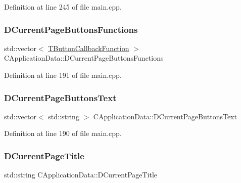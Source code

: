 Definition at line 245 of file main.\+cpp.

\hypertarget{classCApplicationData_ad3079e5563a19d21c1e4ceff2a188382}{}\label{classCApplicationData_ad3079e5563a19d21c1e4ceff2a188382} 
\subsubsection{\texorpdfstring{D\+Current\+Page\+Buttons\+Functions}{DCurrentPageButtonsFunctions}}
{\footnotesize\ttfamily std\+::vector$<$ \hyperlink{main_8cpp_af91bc223ea3fea871af009bfef33c595}{T\+Button\+Callback\+Function} $>$ C\+Application\+Data\+::\+D\+Current\+Page\+Buttons\+Functions\hspace{0.3cm}{\ttfamily [protected]}}



Definition at line 191 of file main.\+cpp.

\hypertarget{classCApplicationData_af04b7f5f8ba4e5c99c0a3530055fc15d}{}\label{classCApplicationData_af04b7f5f8ba4e5c99c0a3530055fc15d} 
\subsubsection{\texorpdfstring{D\+Current\+Page\+Buttons\+Text}{DCurrentPageButtonsText}}
{\footnotesize\ttfamily std\+::vector$<$ std\+::string $>$ C\+Application\+Data\+::\+D\+Current\+Page\+Buttons\+Text\hspace{0.3cm}{\ttfamily [protected]}}



Definition at line 190 of file main.\+cpp.

\hypertarget{classCApplicationData_a49ce7f0b5891f0f2c29b73aad636b761}{}\label{classCApplicationData_a49ce7f0b5891f0f2c29b73aad636b761} 
\subsubsection{\texorpdfstring{D\+Current\+Page\+Title}{DCurrentPageTitle}}
{\footnotesize\ttfamily std\+::string C\+Application\+Data\+::\+D\+Current\+Page\+Title\hspace{0.3cm}{\ttfamily [protected]}}



